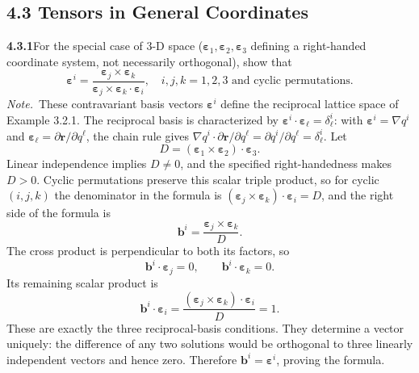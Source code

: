 \subsection*{4.3 Tensors in General Coordinates}

\par\bigskip
\noindent\textbf{4.3.1}\quad For the special case of 3-D space
($\boldsymbol{\varepsilon}_{1},\boldsymbol{\varepsilon}_{2},
\boldsymbol{\varepsilon}_{3}$ defining a right-handed coordinate system, not
necessarily orthogonal), show that
\[
\boldsymbol{\varepsilon}^{i}
=\frac{\boldsymbol{\varepsilon}_{j}\times\boldsymbol{\varepsilon}_{k}}
{\boldsymbol{\varepsilon}_{j}\times\boldsymbol{\varepsilon}_{k}\cdot
\boldsymbol{\varepsilon}_{i}},\quad i,j,k=1,2,3\text{ and cyclic
permutations.}
\]
\emph{Note.}~These contravariant basis vectors
$\boldsymbol{\varepsilon}^{i}$ define the reciprocal lattice space of
Example 3.2.1.
\solution
The reciprocal basis is characterized by
$\boldsymbol\varepsilon^i\cdot\boldsymbol\varepsilon_\ell
=\delta^i_\ell$: with $\boldsymbol\varepsilon^i=\nabla q^i$ and
$\boldsymbol\varepsilon_\ell=\partial\mathbf r/\partial q^\ell$, the chain
rule gives
$\nabla q^i\cdot\partial\mathbf r/\partial q^\ell
=\partial q^i/\partial q^\ell=\delta^i_\ell$. Let
\[
D=(\boldsymbol\varepsilon_1\times\boldsymbol\varepsilon_2)
 \cdot\boldsymbol\varepsilon_3.
\]
Linear independence implies $D\ne0$, and the specified right-handedness
makes $D>0$. Cyclic permutations preserve this scalar triple product,
so for cyclic $(i,j,k)$ the denominator in the formula is
$(\boldsymbol\varepsilon_j\times\boldsymbol\varepsilon_k)
\cdot\boldsymbol\varepsilon_i=D$, and the right side of the formula is
\[
\mathbf b^i=\frac{\boldsymbol\varepsilon_j\times
                         \boldsymbol\varepsilon_k}{D}.
\]
The cross product is perpendicular to both its factors, so
\[
\mathbf b^i\cdot\boldsymbol\varepsilon_j=0,\qquad
\mathbf b^i\cdot\boldsymbol\varepsilon_k=0.
\]
Its remaining scalar product is
\[
\mathbf b^i\cdot\boldsymbol\varepsilon_i
=\frac{(\boldsymbol\varepsilon_j\times\boldsymbol\varepsilon_k)
            \cdot\boldsymbol\varepsilon_i}{D}=1.
\]
These are exactly the three reciprocal-basis conditions. They determine
a vector uniquely: the difference of any two solutions would be
orthogonal to three linearly independent vectors and hence zero.
Therefore $\mathbf b^i=\boldsymbol\varepsilon^i$, proving the formula.

